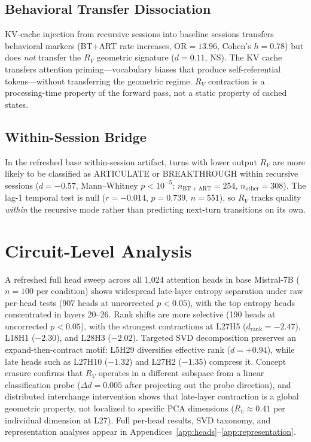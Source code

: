 \documentclass{article}
\newcommand{\RV}{R_V}
\newcommand{\dcohen}{d}
\begin{document}
\subsection{Behavioral Transfer Dissociation}
\label{sec:dissoc_behavioral}

KV-cache injection from recursive sessions into baseline sessions transfers behavioral markers
(BT+ART rate increases, OR${}= 13.96$, Cohen's $h = 0.78$) but does \emph{not} transfer the
$\RV$ geometric signature ($\dcohen = 0.11$, NS).
The KV cache transfers attention priming---vocabulary biases that produce self-referential
tokens---without transferring the geometric regime.
$\RV$ contraction is a processing-time property of the forward pass, not a static property
of cached states.

\subsection{Within-Session Bridge}
\label{sec:bridge}

In the refreshed base within-session artifact, turns with lower output $\RV$ are more likely to be
classified as ARTICULATE or BREAKTHROUGH within recursive sessions
($\dcohen = -0.57$, Mann--Whitney $p < 10^{-5}$; $n_\mathrm{BT+ART}=254$,
$n_\mathrm{other}=308$).
The lag-1 temporal test is null ($r = -0.014$, $p = 0.739$, $n = 551$), so $\RV$
tracks quality \emph{within} the recursive mode rather than predicting next-turn transitions on its own.


\section{Circuit-Level Analysis}
\label{sec:circuits}

A refreshed full head sweep across all 1{,}024 attention heads in base Mistral-7B
($n = 100$ per condition) shows widespread late-layer entropy separation under raw per-head tests
(907 heads at uncorrected $p < 0.05$), with the top entropy heads concentrated in layers 20--26.
Rank shifts are more selective (190 heads at uncorrected $p < 0.05$), with the strongest
contractions at L27H5 ($\dcohen_\mathrm{rank} = -2.47$), L18H1 ($-2.30$), and L28H3 ($-2.02$).
Targeted SVD decomposition preserves an expand-then-contract motif:
L5H29 diversifies effective rank ($\dcohen = +0.94$), while late heads such as
L27H10 ($-1.32$) and L27H2 ($-1.35$) compress it.
Concept erasure confirms that $\RV$ operates in a different subspace from a linear
classification probe ($\Delta d = 0.005$ after projecting out the probe direction), and
distributed interchange intervention shows that late-layer contraction is a global geometric
property, not localized to specific PCA dimensions ($\RV \approx 0.41$ per individual dimension
at L27).
Full per-head results, SVD taxonomy, and representation analyses appear in
Appendices~\ref{app:heads}--\ref{app:representation}.
\end{document}
